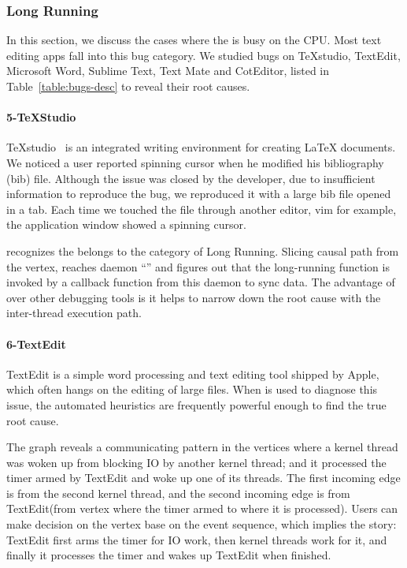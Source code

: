 \subsubsection{Long Running}

In this section, we discuss the cases where the \spinningnode is busy on the
CPU. Most text editing apps fall into this bug category. We studied bugs on
TeXstudio, TextEdit, Microsoft Word, Sublime Text, Text Mate and CotEditor,
listed in Table~\ref{table:bugs-desc} to reveal their root causes.


\paragraph{5-TeXStudio}

TeXstudio~\cite{TeXStudio} is an integrated writing environment for creating
LaTeX documents. We noticed a user reported spinning cursor when he modified
his bibliography (bib) file. Although the issue was closed by the developer,
due to insufficient information to reproduce the bug, we reproduced it with a
large bib file opened in a tab. Each time we touched the file through another
editor, vim for example, the application window showed a spinning cursor.

\xxx recognizes the \spinningnode belongs to the category of Long Running.
Slicing causal path from the vertex, \xxx reaches daemon ``'' and
figures out that the long-running function is invoked by a callback function
from this daemon to sync data. The advantage of \xxx over other debugging tools
is it helps to narrow down the root cause with the inter-thread execution path.

\paragraph{6-TextEdit}

TextEdit is a simple word processing and text editing tool shipped by Apple,
which often hangs on the editing of large files.  When \xxx is used to diagnose
this issue, the automated heuristics are frequently powerful enough to find the
true root cause.

The graph reveals a communicating pattern in the vertices where a kernel thread
was woken up from blocking IO by another kernel thread; and it processed the
timer armed by TextEdit and woke up one of its threads. The first incoming edge
is from the second kernel thread, and the second incoming edge is from
TextEdit(from vertex where the timer armed to where it is processed). Users can
make decision on the vertex base on the event sequence, which implies the
story: TextEdit first arms the timer for IO work, then kernel threads work for
it, and finally it processes the timer and wakes up TextEdit when finished.

